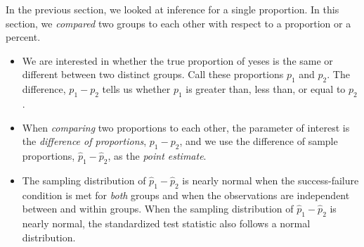 \noindent In the previous section, we looked at inference for a single proportion.  In this section, we \emph{compared} two groups to each other with respect to a proportion or a percent.
\begin{itemize} 
\item We are interested in whether the true proportion of yeses is the same or different between two distinct groups.  Call these proportions $p_1$ and $p_2$.  The difference, $p_1-p_2$ tells us whether $p_1$ is greater than, less than, or equal to $p_2$.  

\item When \emph{comparing} two proportions to each other, the parameter of interest is the \emph{difference of proportions}, $p_1-p_2$, and we use the difference of sample proportions, $\hat{p}_1-\hat{p}_2$, as the \emph{point estimate}.  

\item The sampling distribution of $\hat{p}_1-\hat{p}_2$ is nearly normal when the success-failure condition is met for \textit{both} groups and when the observations are independent between and within groups.  When the sampling distribution of $\hat{p}_1-\hat{p}_2$ is nearly normal, the standardized test statistic also follows a normal distribution.


\end{itemize}
